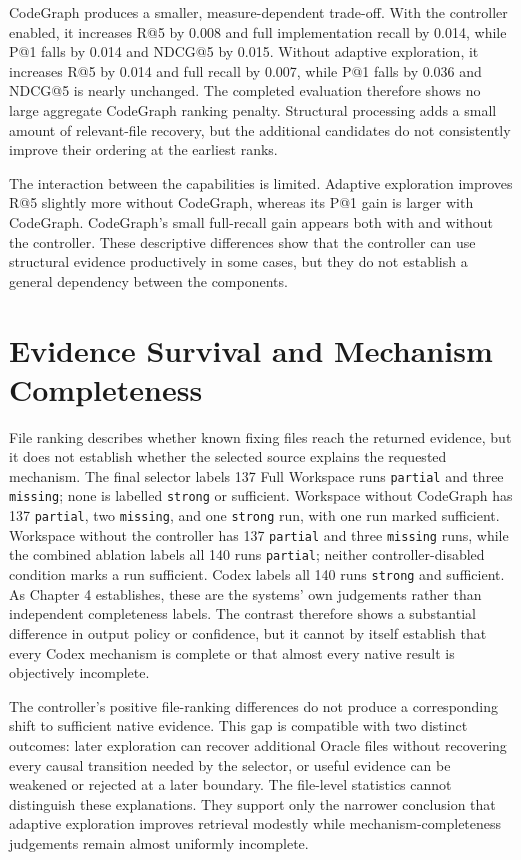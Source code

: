 CodeGraph produces a smaller, measure-dependent trade-off. With the controller enabled, it increases R@5 by 0.008 and full implementation recall by 0.014, while P@1 falls by 0.014 and NDCG@5 by 0.015. Without adaptive exploration, it increases R@5 by 0.014 and full recall by 0.007, while P@1 falls by 0.036 and NDCG@5 is nearly unchanged. The completed evaluation therefore shows no large aggregate CodeGraph ranking penalty. Structural processing adds a small amount of relevant-file recovery, but the additional candidates do not consistently improve their ordering at the earliest ranks.

The interaction between the capabilities is limited. Adaptive exploration improves R@5 slightly more without CodeGraph, whereas its P@1 gain is larger with CodeGraph. CodeGraph's small full-recall gain appears both with and without the controller. These descriptive differences show that the controller can use structural evidence productively in some cases, but they do not establish a general dependency between the components.

\section{Evidence Survival and Mechanism Completeness}\label{sec:evidence-survival-and-mechanism-completeness}

File ranking describes whether known fixing files reach the returned evidence, but it does not establish whether the selected source explains the requested mechanism. The final selector labels 137 Full Workspace runs \texttt{partial} and three \texttt{missing}; none is labelled \texttt{strong} or sufficient. Workspace without CodeGraph has 137 \texttt{partial}, two \texttt{missing}, and one \texttt{strong} run, with one run marked sufficient. Workspace without the controller has 137 \texttt{partial} and three \texttt{missing} runs, while the combined ablation labels all 140 runs \texttt{partial}; neither controller-disabled condition marks a run sufficient. Codex labels all 140 runs \texttt{strong} and sufficient. As Chapter 4 establishes, these are the systems' own judgements rather than independent completeness labels. The contrast therefore shows a substantial difference in output policy or confidence, but it cannot by itself establish that every Codex mechanism is complete or that almost every native result is objectively incomplete.

The controller's positive file-ranking differences do not produce a corresponding shift to sufficient native evidence. This gap is compatible with two distinct outcomes: later exploration can recover additional Oracle files without recovering every causal transition needed by the selector, or useful evidence can be weakened or rejected at a later boundary. The file-level statistics cannot distinguish these explanations. They support only the narrower conclusion that adaptive exploration improves retrieval modestly while mechanism-completeness judgements remain almost uniformly incomplete.

